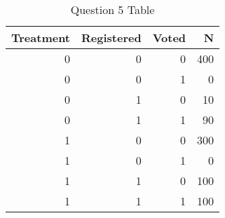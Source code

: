 \documentclass[11pt,notitlepage]{article}\usepackage[]{graphicx}\usepackage[]{color}
\begin{document}
\begin{table}[H]
  \centering
  \caption{Question 5 Table}
    \begin{tabular}{rrrr}
    \toprule
    Treatment  & Registered  & Voted  & N  \\
    \midrule
    0     & 0     & 0     & 400 \\
    0     & 0     & 1     & 0 \\
    0     & 1     & 0     & 10 \\
    0     & 1     & 1     & 90 \\
    1     & 0     & 0     & 300 \\
    1     & 0     & 1     & 0 \\
    1     & 1     & 0     & 100 \\
    1     & 1     & 1     & 100 \\
    \bottomrule
    \end{tabular}%
  \label{tab:addlabel}%
\end{table}%
\end{document}

